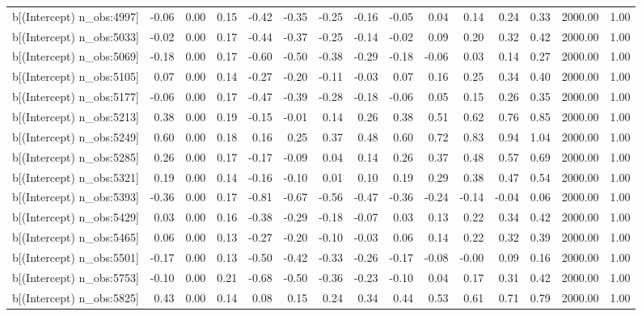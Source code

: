 \begin{table}[ht]
\begin{tabular}{rrrrrrrrrrrrrrr}
  b[(Intercept) n\_obs:4997] & -0.06 & 0.00 & 0.15 & -0.42 & -0.35 & -0.25 & -0.16 & -0.05 & 0.04 & 0.14 & 0.24 & 0.33 & 2000.00 & 1.00 \\ 
  b[(Intercept) n\_obs:5033] & -0.02 & 0.00 & 0.17 & -0.44 & -0.37 & -0.25 & -0.14 & -0.02 & 0.09 & 0.20 & 0.32 & 0.42 & 2000.00 & 1.00 \\ 
  b[(Intercept) n\_obs:5069] & -0.18 & 0.00 & 0.17 & -0.60 & -0.50 & -0.38 & -0.29 & -0.18 & -0.06 & 0.03 & 0.14 & 0.27 & 2000.00 & 1.00 \\ 
  b[(Intercept) n\_obs:5105] & 0.07 & 0.00 & 0.14 & -0.27 & -0.20 & -0.11 & -0.03 & 0.07 & 0.16 & 0.25 & 0.34 & 0.40 & 2000.00 & 1.00 \\ 
  b[(Intercept) n\_obs:5177] & -0.06 & 0.00 & 0.17 & -0.47 & -0.39 & -0.28 & -0.18 & -0.06 & 0.05 & 0.15 & 0.26 & 0.35 & 2000.00 & 1.00 \\ 
  b[(Intercept) n\_obs:5213] & 0.38 & 0.00 & 0.19 & -0.15 & -0.01 & 0.14 & 0.26 & 0.38 & 0.51 & 0.62 & 0.76 & 0.85 & 2000.00 & 1.00 \\ 
  b[(Intercept) n\_obs:5249] & 0.60 & 0.00 & 0.18 & 0.16 & 0.25 & 0.37 & 0.48 & 0.60 & 0.72 & 0.83 & 0.94 & 1.04 & 2000.00 & 1.00 \\ 
  b[(Intercept) n\_obs:5285] & 0.26 & 0.00 & 0.17 & -0.17 & -0.09 & 0.04 & 0.14 & 0.26 & 0.37 & 0.48 & 0.57 & 0.69 & 2000.00 & 1.00 \\ 
  b[(Intercept) n\_obs:5321] & 0.19 & 0.00 & 0.14 & -0.16 & -0.10 & 0.01 & 0.10 & 0.19 & 0.29 & 0.38 & 0.47 & 0.54 & 2000.00 & 1.00 \\ 
  b[(Intercept) n\_obs:5393] & -0.36 & 0.00 & 0.17 & -0.81 & -0.67 & -0.56 & -0.47 & -0.36 & -0.24 & -0.14 & -0.04 & 0.06 & 2000.00 & 1.00 \\ 
  b[(Intercept) n\_obs:5429] & 0.03 & 0.00 & 0.16 & -0.38 & -0.29 & -0.18 & -0.07 & 0.03 & 0.13 & 0.22 & 0.34 & 0.42 & 2000.00 & 1.00 \\ 
  b[(Intercept) n\_obs:5465] & 0.06 & 0.00 & 0.13 & -0.27 & -0.20 & -0.10 & -0.03 & 0.06 & 0.14 & 0.22 & 0.32 & 0.39 & 2000.00 & 1.00 \\ 
  b[(Intercept) n\_obs:5501] & -0.17 & 0.00 & 0.13 & -0.50 & -0.42 & -0.33 & -0.26 & -0.17 & -0.08 & -0.00 & 0.09 & 0.16 & 2000.00 & 1.00 \\ 
  b[(Intercept) n\_obs:5753] & -0.10 & 0.00 & 0.21 & -0.68 & -0.50 & -0.36 & -0.23 & -0.10 & 0.04 & 0.17 & 0.31 & 0.42 & 2000.00 & 1.00 \\ 
  b[(Intercept) n\_obs:5825] & 0.43 & 0.00 & 0.14 & 0.08 & 0.15 & 0.24 & 0.34 & 0.44 & 0.53 & 0.61 & 0.71 & 0.79 & 2000.00 & 1.00 \\ 

\end{tabular}
\end{table}
